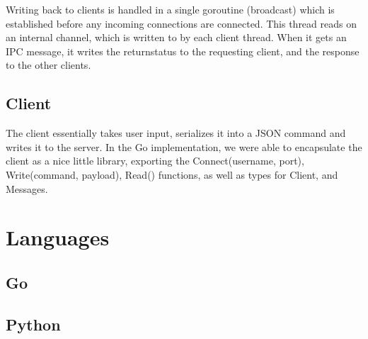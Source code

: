 \documentclass[10pt, letterpaper]{article}
\begin{document}
Writing back to clients is handled in a single goroutine (broadcast) which is 
established before any incoming connections are connected. This thread reads 
on an internal channel, which is written to by each client thread. When it 
gets an IPC message, it writes the returnstatus to the requesting client, and 
the response to the other clients.

\subsection*{Client}

The client essentially takes user input, serializes it into a JSON command 
and writes it to the server. In the Go implementation, we were able to 
encapsulate the client as a nice little library, exporting the 
Connect(username, port), Write(command, payload), Read() functions, as well 
as types for Client, and Messages.

\section*{Languages}

\subsection*{Go}

\subsection*{Python}
\end{document}
